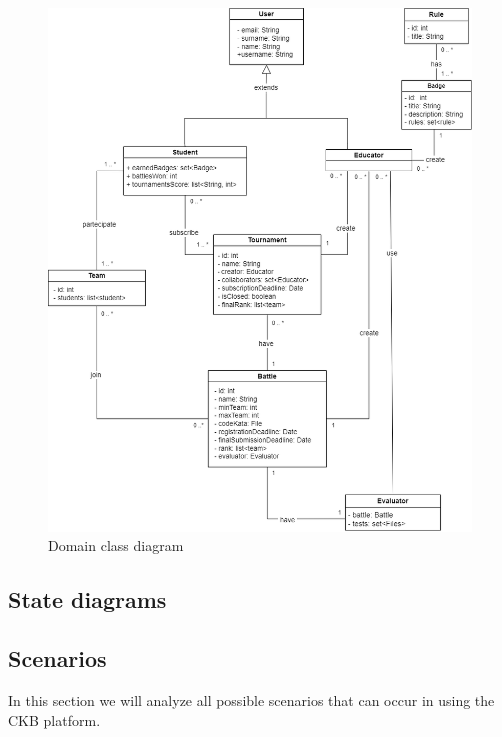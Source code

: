 \begin{figure}[H]
    \centering
    \includegraphics[scale=0.5]{images/class_diagram.png}
    \caption{Domain class diagram}
    \label{fig:class_diagram}
\end{figure}
\clearpage

\subsection{State diagrams}
\clearpage

\subsection{Scenarios}
In this section we will analyze all possible scenarios that can occur in using the CKB platform.

